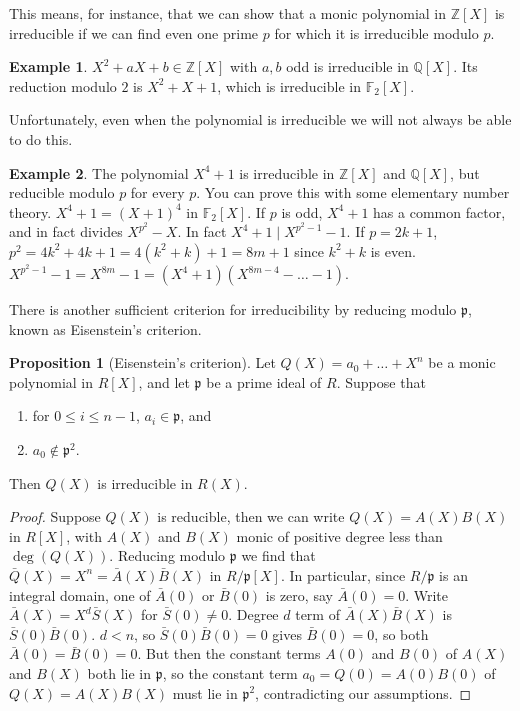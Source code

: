 \documentclass{article}
\newcommand{\F}{\mathbb{F}}
\newcommand{\Z}{\mathbb{Z}}
\newcommand{\Q}{\mathbb{Q}}
\newcommand{\rb}[1]{\left( #1 \right)}
\renewcommand{\sb}[1]{\left[ #1 \right]}
\theoremstyle{definition}\newtheorem{definition}{Definition}[subsection]
\theoremstyle{definition}\newtheorem{remark}[definition]{Remark}
\theoremstyle{definition}\newtheorem*{example}{Example}
\theoremstyle{definition}\newtheorem*{note}{Note}
\newtheorem{proposition}[definition]{Proposition}
\begin{document}
This means, for instance, that we can show that a monic polynomial in $ \Z\sb{X} $ is irreducible if we can find even one prime $ p $ for which it is irreducible modulo $ p $.

\begin{example}
$ X^2 + aX + b \in \Z\sb{X} $ with $ a, b $ odd is irreducible in $ \Q\sb{X} $. Its reduction modulo $ 2 $ is $ X^2 + X + 1 $, which is irreducible in $ \F_2\sb{X} $.
\end{example}

Unfortunately, even when the polynomial is irreducible we will not always be able to do this.

\begin{example}
The polynomial $ X^4 + 1 $ is irreducible in $ \Z\sb{X} $ and $ \Q\sb{X} $, but reducible modulo $ p $ for every $ p $. You can prove this with some elementary number theory. $ X^4 + 1 = \rb{X + 1}^4 $ in $ \F_2\sb{X} $. If $ p $ is odd, $ X^4 + 1 $ has a common factor, and in fact divides $ X^{p^2} - X $. In fact $ X^4 + 1 \mid X^{p^2 - 1} - 1 $. If $ p = 2k + 1 $, $ p^2 = 4k^2 + 4k + 1 = 4\rb{k^2 + k} + 1 = 8m + 1 $ since $ k^2 + k $ is even. $ X^{p^2 - 1} - 1 = X^{8m} - 1 = \rb{X^4 + 1}\rb{X^{8m - 4} - \dots - 1} $.
\end{example}

There is another sufficient criterion for irreducibility by reducing modulo $ \mathfrak{p} $, known as Eisenstein's criterion.

\begin{proposition}[Eisenstein's criterion]
Let $ Q\rb{X} = a_0 + \dots + X^n $ be a monic polynomial in $ R\sb{X} $, and let $ \mathfrak{p} $ be a prime ideal of $ R $. Suppose that
\begin{enumerate}
\item for $ 0 \le i \le n - 1 $, $ a_i \in \mathfrak{p} $, and
\item $ a_0 \notin \mathfrak{p}^2 $.
\end{enumerate}
Then $ Q\rb{X} $ is irreducible in $ R\rb{X} $.
\end{proposition}

\begin{proof}
Suppose $ Q\rb{X} $ is reducible, then we can write $ Q\rb{X} = A\rb{X}B\rb{X} $ in $ R\sb{X} $, with $ A\rb{X} $ and $ B\rb{X} $ monic of positive degree less than $ \deg\rb{Q\rb{X}} $. Reducing modulo $ \mathfrak{p} $ we find that $ \bar{Q}\rb{X} = X^n = \bar{A}\rb{X}\bar{B}\rb{X} $ in $ R / \mathfrak{p}\sb{X} $. In particular, since $ R / \mathfrak{p} $ is an integral domain, one of $ \bar{A}\rb{0} $ or $ \bar{B}\rb{0} $ is zero, say $ \bar{A}\rb{0} = 0 $. Write $ \bar{A}\rb{X} = X^d\bar{S}\rb{X} $ for $ \bar{S}\rb{0} \ne 0 $. Degree $ d $ term of $ \bar{A}\rb{X}\bar{B}\rb{X} $ is $ \bar{S}\rb{0}\bar{B}\rb{0} $. $ d < n $, so $ \bar{S}\rb{0}\bar{B}\rb{0} = 0 $ gives $ \bar{B}\rb{0} = 0 $, so both $ \bar{A}\rb{0} = \bar{B}\rb{0} = 0 $. But then the constant terms $ A\rb{0} $ and $ B\rb{0} $ of $ A\rb{X} $ and $ B\rb{X} $ both lie in $ \mathfrak{p} $, so the constant term $ a_0 = Q\rb{0} = A\rb{0}B\rb{0} $ of $ Q\rb{X} = A\rb{X}B\rb{X} $ must lie in $ \mathfrak{p}^2 $, contradicting our assumptions.
\end{proof}
\end{document}
